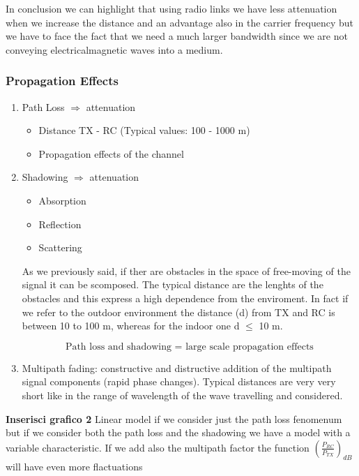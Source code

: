 In conclusion we can highlight that using radio links we have less attenuation when we increase the distance and an advantage also in the carrier frequency but we have to face the fact that we need a much larger bandwidth since we are not conveying electricalmagnetic waves into a medium.  

\subsubsection{Propagation Effects }

\begin{enumerate}
\item Path Loss $\Rightarrow$ attenuation
\begin{itemize}
\item Distance TX - RC (Typical values: 100 - 1000 m)
\item Propagation effects of the channel 
\end{itemize}
\item Shadowing $\Rightarrow$ attenuation
\begin{itemize}
\item Absorption
\item Reflection
\item Scattering
\end{itemize}

As we previously said, if ther are obstacles in the space of free-moving of the signal it can be scomposed. The typical distance are the lenghts of the obstacles and this express a high dependence from the enviroment. In fact if we refer to the outdoor environment the distance (d) from TX and RC is between 10 to 100 m, whereas for the indoor one d $\leq$ 10 m.

$$\text{Path loss and shadowing = large scale propagation effects}$$
\item Multipath fading: constructive and distructive addition of the multipath signal components (rapid phase changes).
Typical distances are very very short like in the range of wavelength of the wave travelling and considered. 
\end{enumerate}

\textbf{Inserisci grafico 2}
Linear model if we consider just the path loss fenomenum but if we consider both the path loss and the shadowing we have a model with a variable characteristic. If we add also the multipath factor the function $(\frac{P_{RC}}{P_{TX}})_{dB}$ will have even more flactuations    


